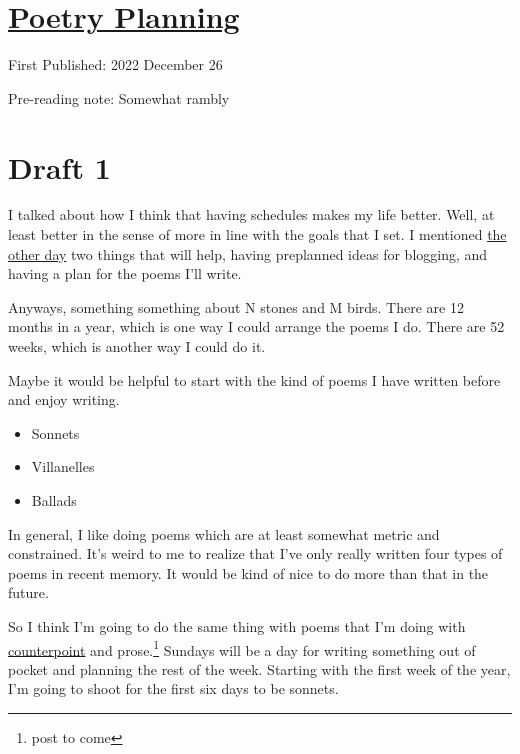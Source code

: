 \documentclass[12pt]{article}[titlepage]
\newcommand{\1}{\={a}}
\newcommand{\2}{\={e}}
\newcommand{\3}{\={\i}}
\newcommand{\4}{\=o}
\newcommand{\5}{\=u}
\newcommand{\6}{\={A}}
\renewcommand{\,}{\textsuperscript{,}}
\begin{document}
\doublespacing
\section{\href{poetry-planning.html}{Poetry Planning}}
First Published: 2022 December 26

Pre-reading note: Somewhat rambly
\section{Draft 1}
I talked about how I think that having schedules makes my life better.
Well, at least better in the sense of more in line with the goals that I set.
I mentioned \href{new-year-plans-23.html}{the other day} two things that will help, having preplanned ideas for blogging, and having a plan for the poems I'll write.

Anyways, something something about N stones and M birds.
There are 12 months in a year, which is one way I could arrange the poems I do.
There are 52 weeks, which is another way I could do it.

Maybe it would be helpful to start with the kind of poems I have written before and enjoy writing.
\begin{itemize}
\item Sonnets
\item Villanelles
\item Ballads
\end{itemize}
In general, I like doing poems which are at least somewhat metric and constrained.
It's weird to me to realize that I've only really written four types of poems in recent memory.
It would be kind of nice to do more than that in the future.

So I think I'm going to do the same thing with poems that I'm doing with \href{species-counterpoint-planning.html}{counterpoint} and prose.\footnote{post to come}
Sundays will be a day for writing something out of pocket and planning the rest of the week.
Starting with the first week of the year, I'm going to shoot for the first six days to be sonnets. 
\end{document}

